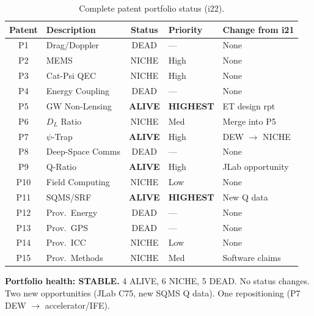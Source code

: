 \documentclass[11pt]{article}
\begin{document}
\begin{table}[H]
\centering
\small
\caption{Complete patent portfolio status (i22).}
\begin{tabular}{clcll}
\toprule
\textbf{Patent} & \textbf{Description} & \textbf{Status}
  & \textbf{Priority} & \textbf{Change from i21} \\
\midrule
P1 & Drag/Doppler & DEAD & --- & None \\
P2 & MEMS & NICHE & High & None \\
P3 & Cat-Psi QEC & NICHE & High & None \\
P4 & Energy Coupling & DEAD & --- & None \\
P5 & GW Non-Lensing & \textbf{ALIVE} & \textbf{HIGHEST} & ET design rpt \\
P6 & $D_L$ Ratio & NICHE & Med & Merge into P5 \\
P7 & $\psi$-Trap & \textbf{ALIVE} & High & DEW $\to$ NICHE \\
P8 & Deep-Space Comms & DEAD & --- & None \\
P9 & Q-Ratio & \textbf{ALIVE} & High & JLab opportunity \\
P10 & Field Computing & NICHE & Low & None \\
P11 & SQMS/SRF & \textbf{ALIVE} & \textbf{HIGHEST} & New Q data \\
P12 & Prov.\ Energy & DEAD & --- & None \\
P13 & Prov.\ GPS & DEAD & --- & None \\
P14 & Prov.\ ICC & NICHE & Low & None \\
P15 & Prov.\ Methods & NICHE & Med & Software claims \\
\bottomrule
\end{tabular}
\end{table}

\textbf{Portfolio health: STABLE.}  4 ALIVE, 6 NICHE, 5 DEAD.
No status changes.  Two new opportunities (JLab C75, new SQMS Q data).
One repositioning (P7 DEW $\to$ accelerator/IFE).
\end{document}
